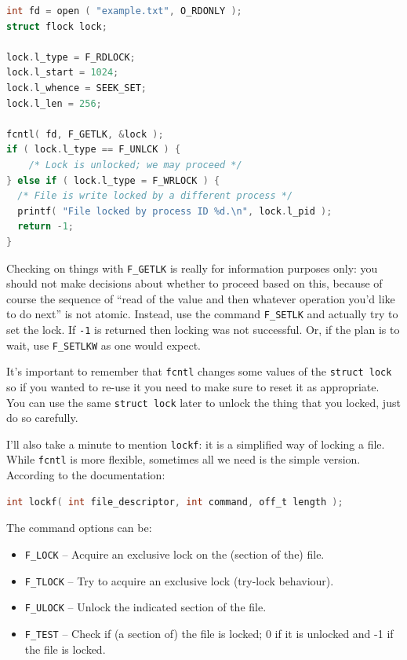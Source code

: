 \begin{lstlisting}[language=C]
int fd = open ( "example.txt", O_RDONLY );
struct flock lock;

lock.l_type = F_RDLOCK;
lock.l_start = 1024;
lock.l_whence = SEEK_SET;
lock.l_len = 256;

fcntl( fd, F_GETLK, &lock );
if ( lock.l_type == F_UNLCK ) {
	/* Lock is unlocked; we may proceed */
} else if ( lock.l_type = F_WRLOCK ) {
  /* File is write locked by a different process */
  printf( "File locked by process ID %d.\n", lock.l_pid );
  return -1;
}
\end{lstlisting}

Checking on things with \texttt{F\_GETLK} is really for information purposes only: you should not make decisions about whether to proceed based on this, because of course the sequence of ``read of the value and then whatever operation you'd like to do next'' is not atomic. Instead, use the command \texttt{F\_SETLK} and actually try to set the lock. If \texttt{-1} is returned then locking was not successful. Or, if the plan is to wait, use \texttt{F\_SETLKW} as one would expect.

It's important to remember that \texttt{fcntl} changes some values of the \texttt{struct lock} so if you wanted to re-use it you need to make sure to reset it as appropriate. You can use the same \texttt{struct lock} later to unlock the thing that you locked, just do so carefully.

I'll also take a minute to mention \texttt{lockf}: it is a simplified way of locking a file. While \texttt{fcntl} is more flexible, sometimes all we need is the simple version. According to the documentation:

\begin{lstlisting}[language=C]
int lockf( int file_descriptor, int command, off_t length );
\end{lstlisting}

The command options can be:
\begin{itemize}
	\item \texttt{F\_LOCK} -- Acquire an exclusive lock on the (section of the) file.
	\item \texttt{F\_TLOCK} -- Try to acquire an exclusive lock (try-lock behaviour).
	\item \texttt{F\_ULOCK} -- Unlock the indicated section of the file.
	\item \texttt{F\_TEST} -- Check if (a section of) the file is locked; 0 if it is unlocked and -1 if the file is locked.
\end{itemize}


